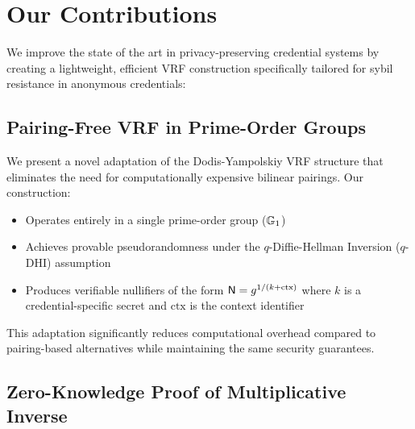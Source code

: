 










\section{Our Contributions}

We improve the state of the art in privacy-preserving credential systems by creating a lightweight, efficient VRF construction specifically tailored for sybil resistance in anonymous credentials:

\subsection{Pairing-Free VRF in Prime-Order Groups}

We present a novel adaptation of the Dodis-Yampolskiy VRF structure that eliminates the need for computationally expensive bilinear pairings. Our construction:

\begin{itemize}
    \item Operates entirely in a single prime-order group ($\mathbb{G}_1$)
    \item Achieves provable pseudorandomness under the $q$-Diffie-Hellman Inversion ($q$-DHI) assumption
    \item Produces verifiable nullifiers of the form $\mathsf{N} = g^{1/(k+\text{ctx})}$ where $k$ is a credential-specific secret and $\text{ctx}$ is the context identifier
\end{itemize}

This adaptation significantly reduces computational overhead compared to pairing-based alternatives while maintaining the same security guarantees.

\subsection{Zero-Knowledge Proof of Multiplicative Inverse}

